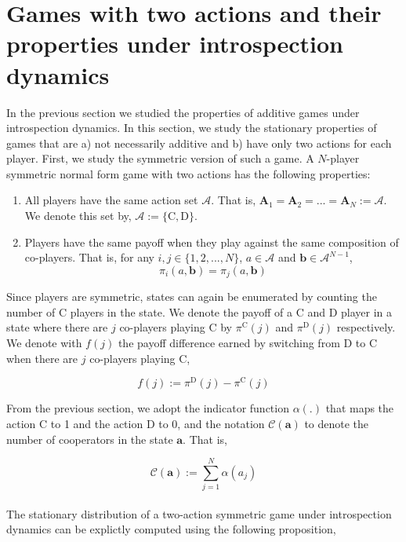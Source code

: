 \documentclass[11pt]{article}
\theoremstyle{plainCl1}
\theoremstyle{plainCl2}
\newcommand{\A}{\mathbf{A}}
\newcommand{\abf}{\mathbf{a}}
\newcommand{\bbf}{\mathbf{b}}
\newcommand{\C}{\mathrm{C}}
\newcommand{\D}{\mathrm{D}}
\begin{document}
\section*{Games with two actions and their properties under introspection dynamics}

In the previous section we studied the properties of additive games under introspection dynamics. In this section, we study the stationary properties of games that are a) not necessarily additive and b) have only two actions for each player. First, we study the symmetric version of such a game. A $N$-player symmetric normal form game with two actions has the following properties:

\begin{enumerate}
\item  All players have the same action set $\mathcal{A}$. That is, $\A_1 = \A_2 = ... = \A_N := \mathcal{A}$. We denote this set by, $\mathcal{A} := \{\C,\D\}$.
\item Players have the same payoff when they play against the same composition of co-players. That is, for any $i,j \in \{1,2,...,N\}$, $a \in \mathcal{A}$ and $\bbf \in \mathcal{A}^{N-1}$,
\begin{equation}
\pi_i(a,\bbf) = \pi_j(a,\bbf)
\end{equation} 
\end{enumerate}

\noindent Since players are symmetric, states can again be enumerated by counting the number of $\C$ players in the state. We denote the payoff of a $\C$ and $\D$ player in a state where there are $j$ co-players playing $\C$ by $\pi^\C(j)$ and $\pi^\D(j)$ respectively. We denote with $f(j)$ the payoff difference earned by switching from $\D$ to $\C$ when there are $j$ co-players playing $\C$, 

\begin{equation}
f(j) := \pi^\D(j) - \pi^\C(j)
\label{Eq:f-switching-CtoD}
\end{equation}

\noindent From the previous section, we adopt the indicator function $\alpha(.)$ that maps the action $\C$ to 1 and the action $\D$ to 0, and the notation $\mathcal{C}(\abf)$ to denote the number of cooperators in the state $\abf$. That is,

\begin{equation}
\mathcal{C}(\abf) := \sum_{j=1}^N \alpha(a_j)
\end{equation}
\\
\noindent The stationary distribution of a two-action symmetric game under introspection dynamics can be explictly computed using the following proposition, 
\end{document}
